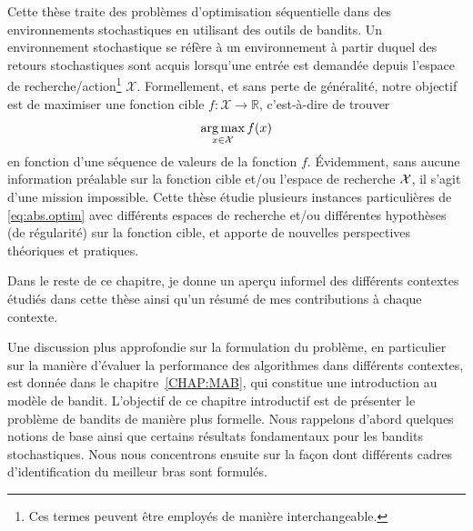 Cette thèse traite des problèmes d'optimisation séquentielle dans des environnements stochastiques en utilisant des outils de bandits. Un environnement stochastique se réfère à un environnement à partir duquel des retours stochastiques sont acquis lorsqu'une entrée est demandée depuis l'espace de recherche/action\footnote{Ces termes peuvent être employés de manière interchangeable.} $\mathcal{X}$. Formellement, et sans perte de généralité, notre objectif est de maximiser une fonction cible $f:\mathcal{X}\rightarrow\mathbb{R}$, c'est-à-dire de trouver 
\begin{equation}\label{eq:abs.optim}
    \operatorname*{arg\,max}_{x\in\mathcal{X}} f(x)
\end{equation}
en fonction d'une séquence de valeurs de la fonction $f$. Évidemment, sans aucune information préalable sur la fonction cible et/ou l'espace de recherche $\mathcal{X}$, il s'agit d'une mission impossible. Cette thèse étudie plusieurs instances particulières de \eqref{eq:abs.optim} avec différents espaces de recherche et/ou différentes hypothèses (de régularité) sur la fonction cible, et apporte de nouvelles perspectives théoriques et pratiques. 

Dans le reste de ce chapitre, je donne un aperçu informel des différents contextes étudiés dans cette thèse ainsi qu'un résumé de mes contributions à chaque contexte.

Une discussion plus approfondie sur la formulation du problème, en particulier sur la manière d'évaluer la performance des algorithmes dans différents contextes, est donnée dans le chapitre~\ref{CHAP:MAB}, qui constitue une introduction au modèle de bandit. L'objectif de ce chapitre introductif est de présenter le problème de bandits de manière plus formelle. Nous rappelons d'abord quelques notions de base ainsi que certains résultats fondamentaux pour les bandits stochastiques. Nous nous concentrons ensuite sur la façon dont différents cadres d'identification du meilleur bras sont formulés.


